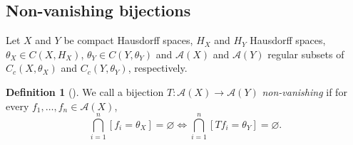 \documentclass[letter,11pt]{amsart}
\theoremstyle{plain}		\newtheorem{theorem}[generalnumbering]{Theorem}
\theoremstyle{plain}		\newtheorem{corollary}[generalnumbering]{Corollary}
\theoremstyle{definition}		\newtheorem{definition}[generalnumbering]{Definition}
\theoremstyle{definition}		\newtheorem{example}[generalnumbering]{Example}
\theoremstyle{plain}		\newtheorem{proposition}[generalnumbering]{Proposition}
\theoremstyle{plain}		\newtheorem{lemma}[generalnumbering]{Lemma}
\theoremstyle{plain}    \newtheorem{plainstyle}[generalnumbering]{\namefordifferentenvironment}
\theoremstyle{plain}    \newtheorem*{plainstyle*}{\namefordifferentenvironment}
\theoremstyle{definition}    \newtheorem{definitionstyle}[generalnumbering]{\namefordifferentenvironment}
\theoremstyle{definition}    \newtheorem*{definitionstyle*}{\namefordifferentenvironment}
\begin{document}
\subsection{Non-vanishing bijections}

Let $X$ and $Y$ be compact Hausdorff spaces, $H_X$ and $H_Y$ Hausdorff spaces, $\theta_X\in C(X,H_X)$, $\theta_Y\in C(Y,\theta_Y)$ and $\mathcal{A}(X)$ and $\mathcal{A}(Y)$ regular subsets of $C_c(X,\theta_X)$ and $C_c(Y,\theta_Y)$, respectively.

\begin{definition}[\cite{MR2324919}]\label{definitionnonvanishingbijection}
	We call a bijection $T\colon\mathcal{A}(X)\to\mathcal{A}(Y)$ \emph{non-vanishing} if for every $f_1,\ldots,f_n\in\mathcal{A}(X)$,
	\[\bigcap_{i=1}^n[f_i=\theta_X]=\varnothing\iff\bigcap_{i=1}^n[Tf_i=\theta_Y]=\varnothing.\]
\end{definition}
\end{document}
